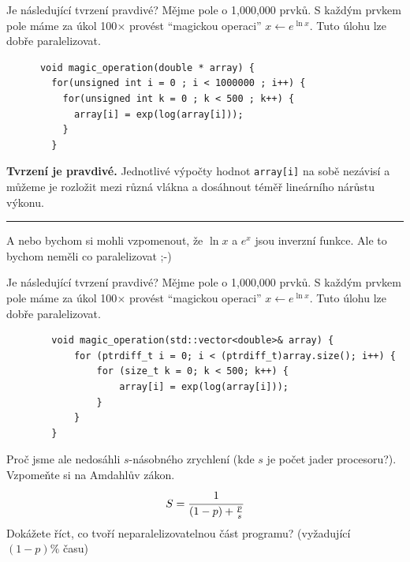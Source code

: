 \documentclass[usenames,dvipsnames,9pt]{beamer}
\newcommand{\see}[1]{\faEye\hspace{5pt}#1}
\begin{document}
{
\setbeamertemplate{frame footer}{\see{{\tt magic.cpp}}}
\begin{frame}[fragile,t]
  \vspace{1em}
  \begin{block}{Je následující tvrzení pravdivé?}
    Mějme pole o 1,000,000 prvků.
    S každým prvkem pole máme za úkol 100$\times$ provést ``magickou operaci'' $x \gets e^{\ln x}$.
    Tuto úlohu lze dobře paralelizovat.

    \begin{verbatim}
      void magic_operation(double * array) {
        for(unsigned int i = 0 ; i < 1000000 ; i++) {
          for(unsigned int k = 0 ; k < 500 ; k++) {
            array[i] = exp(log(array[i]));
          }
        }

    \end{verbatim}
  \end{block}
  \pause
  \textcolor{OliveGreen}{\bf Tvrzení je pravdivé.}
  Jednotlivé výpočty hodnot \texttt{array[i]} na sobě nezávisí a můžeme je rozložit mezi různá vlákna a dosáhnout téměř lineárního nárůstu výkonu.

  \pause
  \vspace{1em}
  \hrule

  \footnotesize
  A nebo bychom si mohli vzpomenout, že $\ln x$ a $e^x$ jsou inverzní funkce.
  Ale to bychom neměli co paralelizovat ;-)
\end{frame}
\begin{frame}[fragile,t]
  \vspace{1em}
  \begin{block}{Je následující tvrzení pravdivé?}
    Mějme pole o 1,000,000 prvků.
    S každým prvkem pole máme za úkol 100$\times$ provést ``magickou operaci'' $x \gets e^{\ln x}$.
    Tuto úlohu lze dobře paralelizovat.

    \begin{verbatim}
        void magic_operation(std::vector<double>& array) {
            for (ptrdiff_t i = 0; i < (ptrdiff_t)array.size(); i++) {
                for (size_t k = 0; k < 500; k++) {
                    array[i] = exp(log(array[i]));
                }
            }
        }
    \end{verbatim}
  \end{block}
  
  Proč jsme ale nedosáhli $s$-násobného zrychlení (kde $s$ je počet jader procesoru?).
  Vzpomeňte si na Amdahlův zákon.
  \[ S = \cfrac{1}{(1-p) + \frac{p}{s}} \]
  Dokážete říct, co tvoří neparalelizovatelnou část programu? (vyžadující $(1-p)\%$ času)
\end{frame}
}
\end{document}
